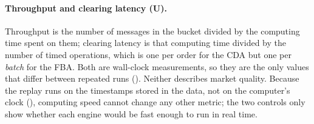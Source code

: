 \paragraph{Throughput and clearing latency (U).} Throughput is the number
of messages in the bucket divided by the computing time spent on them;
clearing latency is that computing time divided by the number of timed
operations, which is one per order for the CDA but one per \emph{batch}
for the FBA. Both are wall-clock measurements, so they are the only
values that differ between repeated runs ().
Neither describes market quality. Because the replay runs on the
timestamps stored in the data, not on the computer's clock
(), computing speed cannot change any other metric;
the two controls only show whether each engine would be fast enough to run
in real time.
